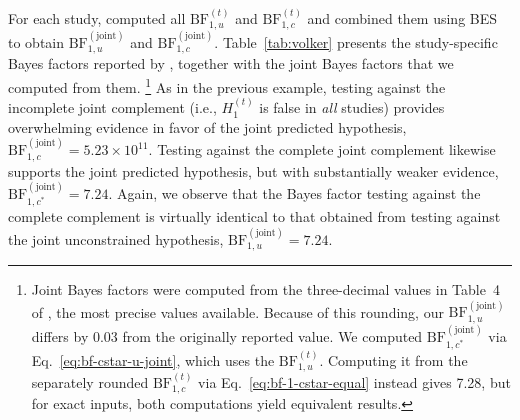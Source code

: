 \documentclass[letterpaper,11pt,oneside]{article}
\begin{document}
For each study, \textcite{volkerFutureMadeToday2022} computed all $\mathrm{BF}_{1,u}^{(t)}$ and $\mathrm{BF}_{1,c}^{(t)}$ and combined them using BES to obtain $\mathrm{BF}_{1,u}^{(\text{joint})}$ and $\mathrm{BF}_{1,c}^{(\text{joint})}$. Table~\ref{tab:volker} presents the study-specific Bayes factors reported by \textcite{volkerFutureMadeToday2022}, together with the joint Bayes factors that we computed from them.%
    \footnote{Joint Bayes factors were computed from the three-decimal values in Table~4 of \textcite{volkerFutureMadeToday2022}, the most precise values available. Because of this rounding, our $\mathrm{BF}_{1,u}^{(\text{joint})}$ differs by 0.03 from the originally reported value. We computed $\mathrm{BF}_{1,c^{*}}^{(\text{joint})}$ via Eq.~\eqref{eq:bf-cstar-u-joint}, which uses the $\mathrm{BF}_{1,u}^{(t)}$. Computing it from the separately rounded $\mathrm{BF}_{1,c}^{(t)}$ via Eq.~\eqref{eq:bf-1-cstar-equal} instead gives 7.28, but for exact inputs, both computations yield equivalent results.}
As in the previous example, testing against the incomplete joint complement (i.e., $H_1^{(t)}$ is false in \textit{all} studies) provides overwhelming evidence in favor of the joint predicted hypothesis, $\mathrm{BF}_{1,c}^{(\text{joint})} = 5.23 \times 10^{11}$. Testing against the complete joint complement likewise supports the joint predicted hypothesis, but with substantially weaker evidence, $\mathrm{BF}_{1,c^{*}}^{(\text{joint})} = 7.24$. Again, we observe that the Bayes factor testing against the complete complement is virtually identical to that obtained from testing against the joint unconstrained hypothesis, $\mathrm{BF}_{1,u}^{(\text{joint})} = 7.24$.
\end{document}

